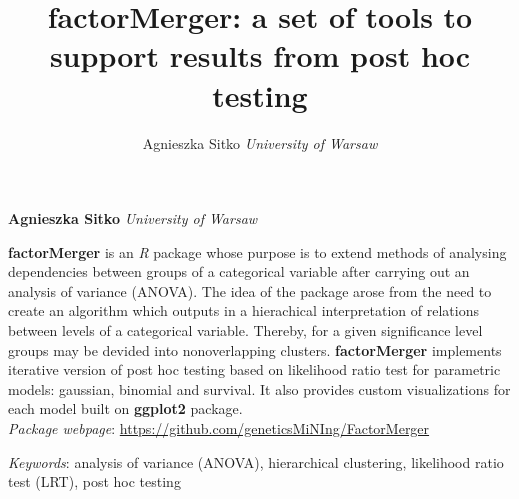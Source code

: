 \documentclass[11pt,]{article}
\title{factorMerger: a set of tools to support results from post hoc testing  }
\author{\Large Agnieszka Sitko\vspace{0.05in} \newline\normalsize\emph{University of Warsaw}  }
\date{}
\newcommand*{\authorfont}{\fontfamily{phv}\selectfont}
\renewenvironment{abstract}
 {{%
    \setlength{\leftmargin}{0mm}
    \setlength{\rightmargin}{\leftmargin}%
  }%
  \relax}
 {\endlist}
\begin{document}
	
%

{%
\setlength{\parindent}{0pt}
\thispagestyle{plain}
{\fontsize{18}{20}\selectfont\raggedright 
\maketitle  %

}

{
   \vskip 13.5pt\relax \normalsize\fontsize{11}{12} 
\textbf{\authorfont Agnieszka Sitko} \hskip 15pt \emph{\small University of Warsaw}   

}

}







\begin{abstract}

    \hbox{\vrule height .2pt width 39.14pc}

    \vskip 8.5pt %

\noindent \textbf{factorMerger} is an \emph{R} package whose purpose is to extend
methods of analysing dependencies between groups of a categorical
variable after carrying out an analysis of variance (ANOVA). The idea of
the package arose from the need to create an algorithm which outputs in
a hierachical interpretation of relations between levels of a
categorical variable. Thereby, for a given significance level groups may
be devided into nonoverlapping clusters. \textbf{factorMerger}
implements iterative version of post hoc testing based on likelihood
ratio test for parametric models: gaussian, binomial and survival. It
also provides custom visualizations for each model built on
\textbf{ggplot2} package. ~\\
\emph{Package webpage}:
\url{https://github.com/geneticsMiNIng/FactorMerger}


\vskip 8.5pt \noindent \emph{Keywords}: analysis of variance (ANOVA), hierarchical clustering, likelihood ratio
test (LRT), post hoc testing \par

    \hbox{\vrule height .2pt width 39.14pc}



\end{abstract}
\end{document}

